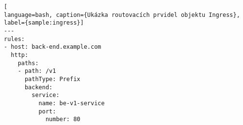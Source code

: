 \begin{lstfloat}
\begin{lstlisting}[
language=bash, caption={Ukázka routovacích prvidel objektu Ingress}, label={sample:ingress}]
---
rules:
- host: back-end.example.com
  http:
    paths:
    - path: /v1
      pathType: Prefix
      backend:
        service:
          name: be-v1-service
          port: 
            number: 80
\end{lstlisting}
\end{lstfloat}